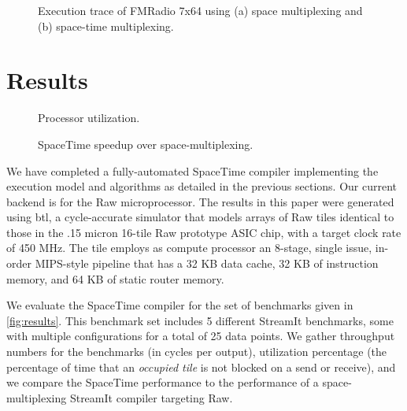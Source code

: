 \begin{figure}[t]
\centering
{}
\vspace{-6pt}
\caption{Execution trace of FMRadio 7x64 using (a) space multiplexing and (b) space-time multiplexing.
\protect\label{fig:bloodgraph}}
\end{figure}

\section{Results}
\label{sec:results}

\begin{figure*}[t]
\centering
{}
\vspace{-6pt}
\caption{Benchmark characteristics, performance evaluation and
comparison to space-multiplexing. 
\protect\label{fig:results}}
\end{figure*}
\begin{figure}[t]
\centering
\hspace{-0.1in}
\vspace{-6pt}
\caption{Processor utilization.
\protect\label{fig:util}}
\end{figure}

\begin{figure}[t]
\centering
\hspace{-0.1in}
\vspace{-6pt}
\caption{SpaceTime speedup over space-multiplexing.
\protect\label{fig:speedup}}
\end{figure}


We have completed a fully-automated SpaceTime compiler implementing
the execution model and algorithms as detailed in the previous
sections. Our current backend is for the Raw microprocessor. The
results in this paper were generated using btl, a cycle-accurate
simulator that models arrays of Raw tiles identical to those in the
.15 micron 16-tile Raw prototype ASIC chip, with a target clock rate
of 450 MHz. The tile employs as compute processor an 8-stage, single
issue, in-order MIPS-style pipeline that has a 32 KB data cache, 32 KB
of instruction memory, and 64 KB of static router memory.

We evaluate the SpaceTime compiler for the set of benchmarks given in
\ref{fig:results}.  This benchmark set includes 5 different StreamIt
benchmarks, some with multiple configurations for a total of 25 data
points.  We gather throughput numbers for the benchmarks (in cycles
per output), utilization percentage (the percentage of time that an
{\it occupied tile} is not blocked on a send or receive), and we
compare the SpaceTime performance to the performance of a
space-multiplexing StreamIt compiler targeting Raw.


